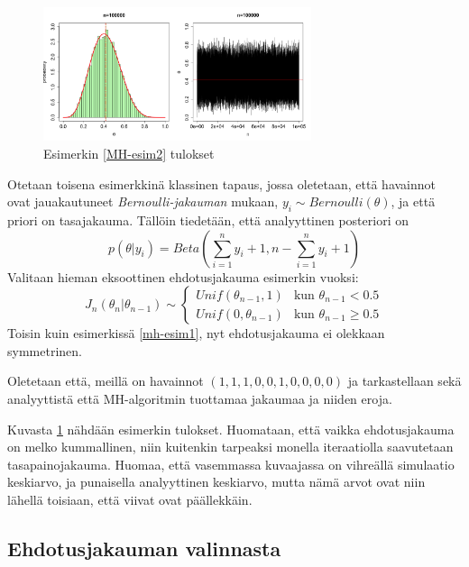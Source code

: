 \begin{esim}\label{MH-esim2}
	\begin{figure}[h!]
		\includegraphics[width=0.7\textwidth]{mhexample2}
		\caption[Yksiulotteinen Metropolis--Hastings esimerkki]{Esimerkin \ref{MH-esim2} tulokset}
		\label{kuva2}
	\end{figure}
	Otetaan toisena esimerkkinä klassinen tapaus, jossa oletetaan, että havainnot ovat jauakautuneet \textit{Bernoulli-jakauman} mukaan, 
	$y_i \sim Bernoulli(\theta)$, 
	ja että priori on tasajakauma. Tällöin tiedetään, että analyyttinen posteriori on 
	\begin{equation*}
		p(\theta|y_i) = Beta(\sum_{i=1}^{n} y_i+1, n - \sum_{i=1}^{n} y_i+1)
	\end{equation*}
	Valitaan hieman eksoottinen ehdotusjakauma esimerkin vuoksi:
	\begin{equation}
		J_n(\theta_n|\theta_{n-1}) \sim \begin{cases}
			Unif(\theta_{n-1},1) & \text{kun } \theta_{n-1}<0.5 \\
			Unif(0,\theta_{n-1}) & \text{kun } \theta_{n-1}\geq0.5
		\end{cases}
	\end{equation}
	Toisin kuin esimerkissä \ref{mh-esim1}, nyt ehdotusjakauma ei olekkaan symmetrinen.
	
	Oletetaan että, meillä on havainnot $(1,1,1,0,0,1,0,0,0,0)$ ja tarkastellaan sekä analyyttistä että MH-algoritmin tuottamaa jakaumaa ja niiden eroja.

	Kuvasta \ref{kuva2} nähdään esimerkin tulokset. Huomataan, että vaikka ehdotusjakauma on melko kummallinen, niin kuitenkin tarpeaksi monella iteraatiolla saavutetaan tasapainojakauma. Huomaa, että vasemmassa kuvaajassa on vihreällä simulaatio keskiarvo, ja punaisella analyyttinen keskiarvo, mutta nämä arvot ovat niin lähellä toisiaan, että viivat ovat päällekkäin.
\end{esim}

\subsection{Ehdotusjakauman valinnasta}

